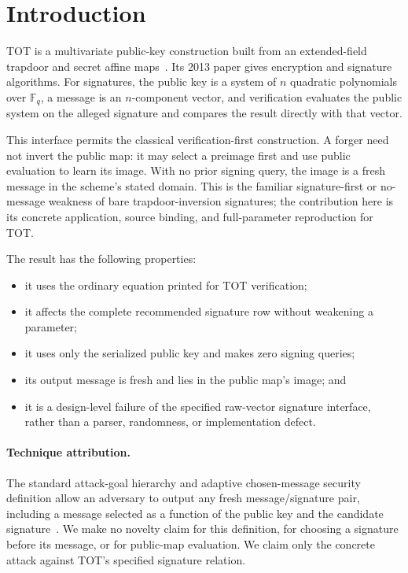 \documentclass[10pt,a4paper]{article}
\newcommand{\F}{\mathbb F}
\begin{document}
\section{Introduction}

TOT is a multivariate public-key construction built from an extended-field
trapdoor and secret affine maps~\cite{tot}.  Its 2013 paper gives encryption
and signature algorithms.  For signatures, the public key is a system of
$n$ quadratic polynomials over $\F_q$, a message is an $n$-component vector,
and verification evaluates the public system on the alleged signature and
compares the result directly with that vector.

This interface permits the classical verification-first construction.  A
forger need not invert the public map: it may select a preimage first and use
public evaluation to learn its image.  With no prior signing query, the image
is a fresh message in the scheme's stated domain.  This is the familiar
signature-first or no-message weakness of bare trapdoor-inversion signatures; the
contribution here is its concrete application, source binding, and
full-parameter reproduction for TOT.

The result has the following properties:
\begin{itemize}
  \item it uses the ordinary equation printed for TOT verification;
  \item it affects the complete recommended signature row without weakening
  a parameter;
  \item it uses only the serialized public key and makes zero signing
  queries;
  \item its output message is fresh and lies in the public map's image; and
  \item it is a design-level failure of the specified raw-vector signature
  interface, rather than a parser, randomness, or implementation defect.
\end{itemize}

\paragraph{Technique attribution.}
The standard attack-goal hierarchy and adaptive chosen-message security
definition allow an adversary to output any fresh message/signature pair,
including a message selected as a function of the public key and the
candidate signature~\cite{hac,gmr}.  We make no novelty claim for this
definition, for choosing a signature before its message, or for public-map
evaluation.  We claim only the concrete attack against TOT's specified
signature relation.
\end{document}
